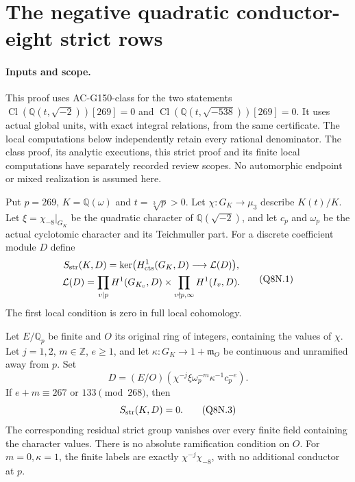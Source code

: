 \section{The negative quadratic conductor-eight strict rows}
\label{sec:negative-quadratic8-strict}

\paragraph{Inputs and scope.}
This proof uses AC-G150-class for the two statements
$\operatorname{Cl}(\mathbb Q(t,\sqrt{-2}))[269]=0$ and
$\operatorname{Cl}(\mathbb Q(t,\sqrt{-538}))[269]=0$.
It uses actual global units, with exact integral relations, from
the same certificate.  The local computations below independently
retain every rational denominator.
The class proof, its analytic executions, this strict proof and its
finite local computations have separately recorded review scopes.
No automorphic endpoint or mixed realization is assumed here.

Put $p=269$, $K=\mathbb Q(\omega)$ and $t=\sqrt[3]p>0$.
Let $\chi:G_K\to\mu_3$ describe $K(t)/K$.
Let $\xi=\chi_{-8}|_{G_K}$ be the quadratic character of
$\mathbb Q(\sqrt{-2})$, and let $c_p$ and $\omega_p$
be the actual cyclotomic character and its Teichmuller part.
For a discrete coefficient module $D$ define
\[
 \begin{gathered}
 S_{\rm str}(K,D)=\ker\bigl(H^1_{\rm cts}(G_K,D)
                                    \longrightarrow\mathcal L(D)\bigr),\\
 \mathcal L(D)=\prod_{v\mid p}H^1(G_{K_v},D)
             \times\prod_{v\nmid p,\infty}H^1(I_v,D).
 \end{gathered}
 \tag{Q8N.1}
\]
The first local condition is zero in full local cohomology.

\begin{theorem}
\label{AC-G150}
Let $E/\mathbb Q_p$ be finite and $O$ its original ring of integers,
containing the values of $\chi$.
Let $j=1,2$, $m\in\mathbb Z$, $e\geq1$, and let
$\kappa:G_K\to1+\mathfrak m_O$ be continuous and unramified
away from $p$.
Set
\[
          D=(E/O)(\chi^{-j}\xi\omega_p^{-m}\kappa^{-1}c_p^{-e}).
 \tag{Q8N.2}
\]
If $e+m\equiv267$ or $133\pmod{268}$, then
\[
                         S_{\rm str}(K,D)=0.
 \tag{Q8N.3}
\]
The corresponding residual strict group vanishes over every finite
field containing the character values.
There is no absolute ramification condition on $O$.
For $m=0,\kappa=1$, the finite labels are exactly
$\chi^{-j}\chi_{-8}$, with no additional conductor at $p$.
\end{theorem}

